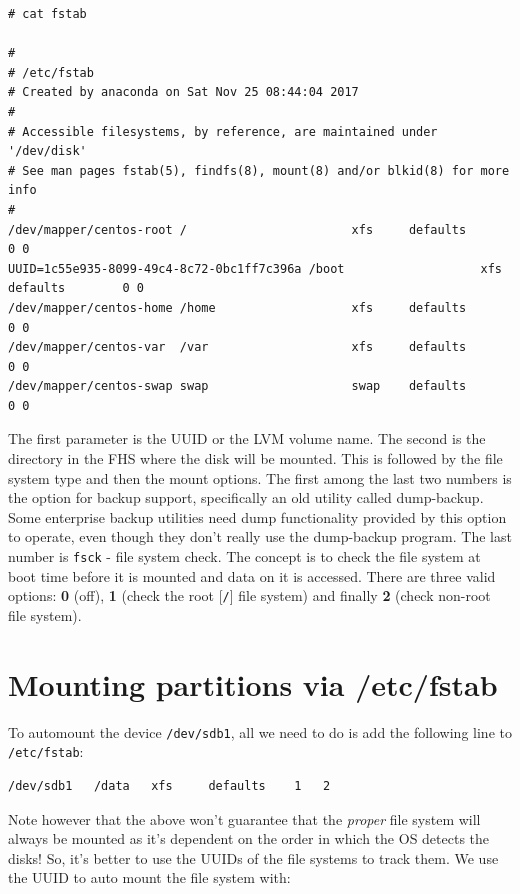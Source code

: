 \vspace{-15pt}
\begin{verbatim}
# cat fstab

#
# /etc/fstab
# Created by anaconda on Sat Nov 25 08:44:04 2017
#
# Accessible filesystems, by reference, are maintained under '/dev/disk'
# See man pages fstab(5), findfs(8), mount(8) and/or blkid(8) for more info
#
/dev/mapper/centos-root /                       xfs     defaults        0 0
UUID=1c55e935-8099-49c4-8c72-0bc1ff7c396a /boot                   xfs     defaults        0 0
/dev/mapper/centos-home /home                   xfs     defaults        0 0
/dev/mapper/centos-var  /var                    xfs     defaults        0 0
/dev/mapper/centos-swap swap                    swap    defaults        0 0
\end{verbatim}
\vspace{-10pt}

\noindent
The first parameter is the UUID or the LVM volume name. The second is the directory in the FHS where the disk will be mounted. This is followed by the file system type and then the mount options. The first among the last two numbers is the option for backup support, specifically an old utility called dump-backup. Some enterprise backup utilities need dump functionality provided by this option to operate, even though they don't really use the dump-backup program. The last number is \verb|fsck| - file system check. The concept is to check the file system at boot time before it is mounted and data on it is accessed. There are three valid options: \textbf{0} (off), \textbf{1} (check the root [\verb|/|] file system) and finally \textbf{2} (check non-root file system). 

	\section{Mounting partitions via /etc/fstab}
To automount the device \verb|/dev/sdb1|, all we need to do is add the following line to \verb|/etc/fstab|:

\vspace{-15pt}
\begin{verbatim}
/dev/sdb1	/data	xfs		defaults	1	2
\end{verbatim}
\vspace{-10pt}

\noindent
Note however that the above won't guarantee that the \textit{proper} file system will always be mounted as it's dependent on the order in which the OS detects the disks! So, it's better to use the UUIDs of the file systems to track them.  We use the UUID to auto mount the file system with:

